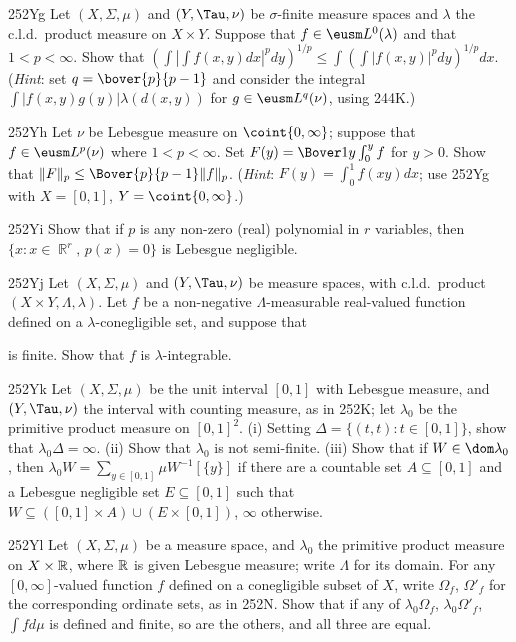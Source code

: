 {\spheader 252Yg Let $(X,\Sigma,\mu)$ and $(Y,\Tau,\nu)$ be
$\sigma$-finite measure spaces and $\lambda$ the c.l.d.\ product measure
on $X\times Y$.   Suppose that
$f\in\eusm L^0(\lambda)$ and that $1<p<\infty$.   Show that
$(\int|\int f(x,y)dx|^pdy)^{1/p}\le\int(\int|f(x,y)|^pdy)^{1/p}dx$.
({\it Hint\/}:
set $q=\bover{p}{p-1}$ and consider the integral
$\int|f(x,y)g(y)|\lambda(d(x,y))$ for $g\in\eusm L^q(\nu)$, using 244K.)

\spheader 252Yh Let $\nu$ be Lebesgue measure on $\coint{0,\infty}$;
suppose that $f\in\eusm L^p(\nu)$ where $1<p<\infty$.   Set
$F(y)=\Bover1y\int_0^yf$ for $y>0$.   Show that
$\|F\|_p\le\Bover{p}{p-1}\|f\|_p$.   ({\it Hint\/}:
$F(y)=\int_0^1f(xy)dx$;  use 252Yg with $X=[0,1]$,
$Y=\coint{0,\infty}$.)

\spheader 252Yi Show that if $p$ is any non-zero (real) polynomial in
$r$ variables, then $\{x:x\in\BbbR^r,\,p(x)=0\}$ is Lebesgue negligible.

\spheader 252Yj Let $(X,\Sigma,\mu)$ and $(Y,\Tau,\nu)$ be measure
spaces, with c.l.d.\ product $(X\times Y,\Lambda,\lambda)$.   Let $f$ be
a non-negative $\Lambda$-measurable real-valued
function defined on a $\lambda$-conegligible set, and suppose that


\noindent is finite.   Show that $f$ is $\lambda$-integrable.

\spheader 252Yk Let $(X,\Sigma,\mu)$ be the unit interval $[0,1]$ with
Lebesgue measure, and $(Y,\Tau,\nu)$ the interval with counting measure,
as in 252K;  let $\lambda_0$ be the primitive product measure on
$[0,1]^2$.   (i) Setting $\Delta=\{(t,t):t\in[0,1]\}$, show that
$\lambda_0\Delta=\infty$.   (ii) Show that
$\lambda_0$ is not semi-finite.   (iii) Show that if
$W\in\dom\lambda_0$, then $\lambda_0W=\sum_{y\in[0,1]}\mu W^{-1}[\{y\}]$
if there are a countable set $A\subseteq[0,1]$ and a Lebesgue negligible
set $E\subseteq[0,1]$ such that
$W\subseteq([0,1]\times A)\cup(E\times[0,1])$, $\infty$ otherwise.

\spheader 252Yl Let $(X,\Sigma,\mu)$ be a measure space, and
$\lambda_0$ the primitive product measure on
$X\times\Bbb R$, where $\Bbb R$ is given Lebesgue measure;  write
$\Lambda$ for its domain.   For any
$[0,\infty]$-valued function $f$ defined on a conegligible subset of
$X$, write $\Omega_f$, $\Omega'_f$ for the corresponding ordinate sets,
as in 252N.   Show that if any of $\lambda_0\Omega_f$,
$\lambda_0\Omega'_f$,
$\int fd\mu$ is defined and finite, so are the others, and all three are
equal.

}
